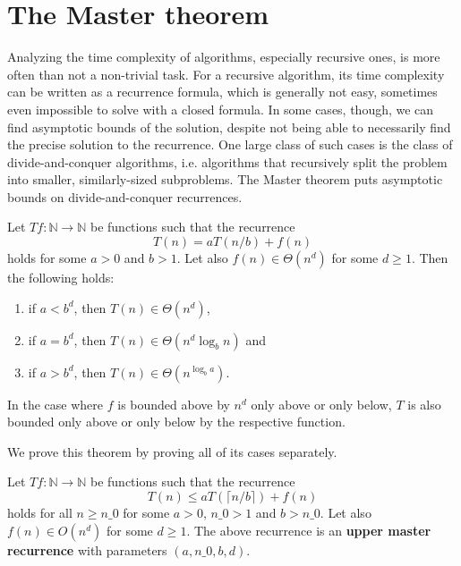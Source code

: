 \section{The Master theorem}

Analyzing the time complexity of algorithms, especially recursive ones, is more often 
than not a non-trivial task. For a recursive algorithm, its time complexity can be 
written as a recurrence formula, which is generally not easy, sometimes even impossible 
to solve with a closed formula. In some cases, though, we can find asymptotic bounds 
of the solution, despite not being able to necessarily find the 
precise solution to the recurrence. One large class of such cases is the class of 
divide-and-conquer algorithms, i.e. algorithms that recursively split the
problem into smaller, similarly-sized subproblems. The Master theorem puts asymptotic 
bounds on divide-and-conquer recurrences.

\begin{theorem}
    Let $T f : \mathbb{N} \rightarrow \mathbb{N}$ be functions such that the recurrence
    \[
        T(n) = a T(n/b) + f(n)
    \]
    holds for some $a > 0$ and $b > 1$. Let also $f(n) \in \Theta(n^d)$ for some $d \ge 1$. 
    Then the following holds:
    \begin{enumerate}
        \item if $a < b^d$, then $T(n) \in \Theta(n^d)$,
        \item if $a = b^d$, then $T(n) \in \Theta(n^d \log_b{n})$ and
        \item if $a > b^d$, then $T(n) \in \Theta(n^{\log_b{a}})$.
    \end{enumerate}
    In the case where $f$ is bounded above by $n^d$ only above or only below,
    $T$ is also bounded only above or only below by the respective function.
\end{theorem}

We prove this theorem by proving all of its cases separately. 

\begin{definition}
    \label{def:upper_master_rec}
    \leanok
    Let $T f : \mathbb{N} \rightarrow \mathbb{N}$ be functions such that the recurrence
    \[
        T(n) \leq a T(\lceil n/b \rceil) + f(n)
    \]
    holds for all $n \ge n\_0$ for some $a > 0$, $n\_0 > 1$ and $b > n\_0$. 
    Let also $f(n) \in O(n^d)$ for some $d \ge 1$. The above recurrence 
    is an \textbf{upper master recurrence} with parameters $(a, n\_0, b, d)$.
\end{definition}

